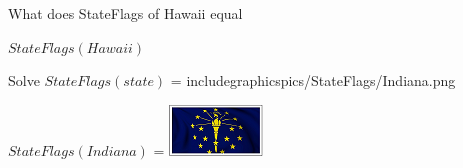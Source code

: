\documentclass{ximera}
\begin{document}
\begin{question}

What does StateFlags of Hawaii equal

\begin{multipleChoice}
\end{multipleChoice}
\begin{feedback}
$StateFlags(Hawaii)$ 
\end{feedback}
\end{question}





\begin{question}

Solve $StateFlags(state)$ = includegraphics{pics/StateFlags/Indiana.png}

\begin{multipleChoice}
\end{multipleChoice}
\begin{feedback}
$StateFlags(Indiana)$ = \includegraphics{pics/StateFlags/Indiana.png}
\end{feedback}
\end{question}
\quad \\
\end{document}
